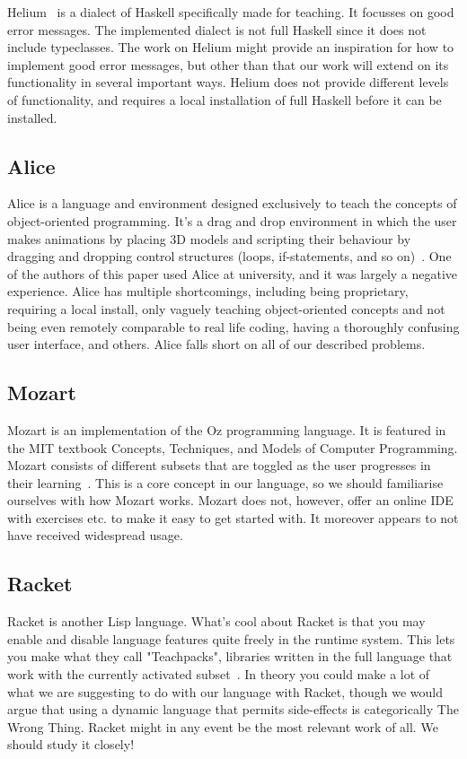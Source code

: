 Helium~\cite{DBLP:conf/haskell/HeerenLI03} is a dialect of Haskell specifically
made for teaching. It focusses on good error messages. The implemented dialect
is not full Haskell since it does not include typeclasses. The work on Helium
might provide an inspiration for how to implement good error messages, but other
than that our work will extend on its functionality in several important ways.
Helium does not provide different levels of functionality, and requires a local
installation of full Haskell before it can be installed.

\subsection{Alice}
Alice is a language and environment designed exclusively to teach the concepts 
of object-oriented programming. It's a drag and drop environment in which the 
user makes animations by placing 3D models and scripting their behaviour by 
dragging and dropping control structures (loops, if-statements, and so 
on)~\cite{alice2015whatisalice}. One of the authors of this paper used Alice 
at university, and it was largely a negative experience. Alice has multiple 
shortcomings, including being proprietary, requiring a local install, only 
vaguely teaching object-oriented concepts and not being even remotely 
comparable to real life coding, having a thoroughly confusing user interface, 
and others. Alice falls short on all of our described problems.

\subsection{Mozart}
Mozart is an implementation of the Oz programming language. It is featured in 
the MIT textbook Concepts, Techniques, and Models of Computer Programming. 
Mozart consists of different subsets that are toggled as the user progresses 
in their learning~\cite{van2004concepts}. This is a core concept in our 
language, so we should familiarise ourselves with how Mozart works. Mozart 
does not, however, offer an online IDE with exercises etc. to make it easy to 
get started with. It moreover appears to not have received widespread usage.

\subsection{Racket}
Racket is another Lisp language. What's cool about Racket is that you may
enable and disable language features quite freely in the runtime system. This
lets you make what they call "Teachpacks", libraries written in the full
language that work with the currently activated subset~\cite{flatt2015racket}.
In theory you could make a lot of what we are suggesting to do with our
language with Racket, though we would argue that using a dynamic language that
permits side-effects is categorically The Wrong Thing. Racket might in any
event be the most relevant work of all. We should study it closely!


